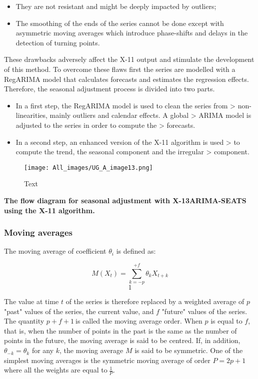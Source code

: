 \documentclass[
]{book}
\begin{document}
\begin{itemize}
\item
  They are not resistant and might be deeply impacted by outliers;
\item
  The smoothing of the ends of the series cannot be done except with asymmetric moving averages which introduce phase-shifts and delays in the detection of turning points.
\end{itemize}

These drawbacks adversely affect the X-11 output and stimulate the
development of this method. To overcome these flaws first the series are
modelled with a RegARIMA model that calculates forecasts and estimates
the regression effects. Therefore, the seasonal adjustment process is
divided into two parts.

\begin{itemize}
\item
  In a first step, the RegARIMA model is used to clean the series from
  \textgreater{} non-linearities, mainly outliers and calendar effects. A global
  \textgreater{} ARIMA model is adjusted to the series in order to compute the
  \textgreater{} forecasts.
\item
  In a second step, an enhanced version of the X-11 algorithm is used
  \textgreater{} to compute the trend, the seasonal component and the irregular
  \textgreater{} component.
\end{itemize}

\begin{figure}
\centering
\texttt{[image: All\_images/UG\_A\_image13.png]}
\caption{Text}
\end{figure}

\textbf{The flow diagram for seasonal adjustment with X-13ARIMA-SEATS using the X-11 algorithm.}

\hypertarget{moving-averages}{%
\subsubsection{Moving averages}\label{moving-averages}}

The moving average of coefficient \(\theta_{i}\) is
defined as:

\[M\left( X_{t} \right) = \sum_{k = - p}^{+ f}\theta_{k}X_{t + k}\] \[1\]

The value at time \(t\) of the series is therefore replaced by a weighted
average of \(p\) "past" values of the series, the current value, and \(f\)
"future" values of the series. The quantity \(p + f + 1\ \)is called the
moving average order. When \(p\) is equal to \(f\), that is, when
the number of points in the past is the same as the number of points in
the future, the moving average is said to be centred. If, in addition,
\(\theta_{- k} = \theta_{k}\) for any \(k\), the moving average \(M\)
is said to be symmetric. One of the simplest moving averages is the
symmetric moving average of order \(P = 2p + 1\) where all the weights are
equal to\(\ \frac{1}{P}\).
\end{document}
